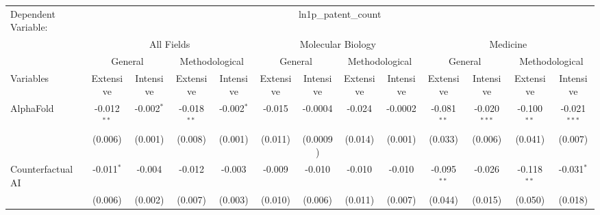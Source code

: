 \begingroup
\centering
\begin{tabular}{lcccccccccccc}
   \tabularnewline \midrule \midrule
   Dependent Variable: & \multicolumn{12}{c}{ln1p\_patent\_count}\\
 & \multicolumn{4}{c}{All Fields} & \multicolumn{4}{c}{Molecular Biology} & \multicolumn{4}{c}{Medicine} \\
\cmidrule(lr){2-5} \cmidrule(lr){6-9} \cmidrule(lr){10-13}
 & \multicolumn{2}{c}{General} & \multicolumn{2}{c}{Methodological} & \multicolumn{2}{c}{General} & \multicolumn{2}{c}{Methodological} & \multicolumn{2}{c}{General} & \multicolumn{2}{c}{Methodological} \\
\cmidrule(lr){2-3} \cmidrule(lr){4-5} \cmidrule(lr){6-7} \cmidrule(lr){8-9} \cmidrule(lr){10-11} \cmidrule(lr){12-13}
Variables & \multicolumn{1}{c}{Extensive} & \multicolumn{1}{c}{Intensive} & \multicolumn{1}{c}{Extensive} & \multicolumn{1}{c}{Intensive} & \multicolumn{1}{c}{Extensive} & \multicolumn{1}{c}{Intensive} & \multicolumn{1}{c}{Extensive} & \multicolumn{1}{c}{Intensive} & \multicolumn{1}{c}{Extensive} & \multicolumn{1}{c}{Intensive} & \multicolumn{1}{c}{Extensive} & \multicolumn{1}{c}{Intensive} \\
\cmidrule(lr){1-1}\cmidrule(lr){2-2} \cmidrule(lr){3-3} \cmidrule(lr){4-4} \cmidrule(lr){5-5} \cmidrule(lr){6-6} \cmidrule(lr){7-7} \cmidrule(lr){8-8} \cmidrule(lr){9-9} \cmidrule(lr){10-10} \cmidrule(lr){11-11} \cmidrule(lr){12-12} \cmidrule(lr){13-13}
   AlphaFold                                & -0.012$^{**}$  & -0.002$^{*}$   & -0.018$^{**}$  & -0.002$^{*}$   & -0.015       & -0.0004      & -0.024       & -0.0002  & -0.081$^{**}$ & -0.020$^{***}$ & -0.100$^{**}$ & -0.021$^{***}$\\   
                                            & (0.006)        & (0.001)        & (0.008)        & (0.001)        & (0.011)      & (0.0009)     & (0.014)      & (0.001)  & (0.033)       & (0.006)        & (0.041)       & (0.007)\\   
   Counterfactual AI                        & -0.011$^{*}$   & -0.004         & -0.012         & -0.003         & -0.009       & -0.010       & -0.010       & -0.010   & -0.095$^{**}$ & -0.026         & -0.118$^{**}$ & -0.031$^{*}$\\   
                                            & (0.006)        & (0.002)        & (0.007)        & (0.003)        & (0.010)      & (0.006)      & (0.011)      & (0.007)  & (0.044)       & (0.015)        & (0.050)       & (0.018)\\   

\end{tabular}
